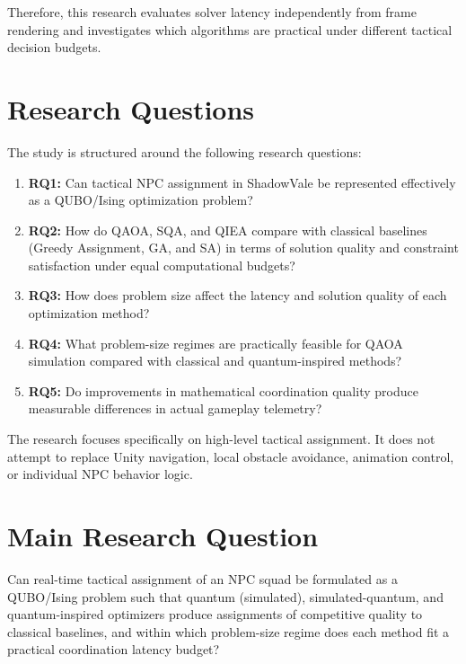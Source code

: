 \documentclass[12pt, a4paper]{article}
\begin{document}
Therefore, this research evaluates solver latency independently from frame rendering and investigates which algorithms are practical under different tactical decision budgets.

\section*{Research Questions}

The study is structured around the following research questions:

\begin{enumerate}
\item \textbf{RQ1:} Can tactical NPC assignment in ShadowVale be represented effectively as a QUBO/Ising optimization problem?

\item \textbf{RQ2:} How do QAOA, SQA, and QIEA compare with classical baselines (Greedy Assignment, GA, and SA) in terms of solution quality and constraint satisfaction under equal computational budgets?

\item \textbf{RQ3:} How does problem size affect the latency and solution quality of each optimization method?

\item \textbf{RQ4:} What problem-size regimes are practically feasible for QAOA simulation compared with classical and quantum-inspired methods?

\item \textbf{RQ5:} Do improvements in mathematical coordination quality produce measurable differences in actual gameplay telemetry?

\end{enumerate}

The research focuses specifically on high-level tactical assignment. It does not attempt to replace Unity navigation, local obstacle avoidance, animation control, or individual NPC behavior logic.

\section*{Main Research Question}

Can real-time tactical assignment of an NPC squad be formulated as a QUBO/Ising problem such that quantum (simulated), simulated-quantum, and quantum-inspired optimizers produce assignments of competitive quality to classical baselines, and within which problem-size regime does each method fit a practical coordination latency budget?
\end{document}
